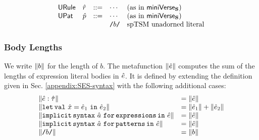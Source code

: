 \[\begin{array}{lllllll}
\mathsf{URule} & \hat{r} & ::= 
& \cdots & \text{(as in $\mathsf{miniVerse}_\textbf{S}$)}\\
\mathsf{UPat} & \hat{p} & ::= 
& \cdots & \text{(as in $\mathsf{miniVerse}_\textbf{S}$)}\\
&&& {\texttt{/}b\texttt{/}} & \text{spTSM unadorned literal}
\end{array}\]
\subsubsection{Body Lengths}
We write $\Vert b \Vert$ for the length of $b$. The metafunction $\Vert {\hat e} \Vert$ computes the sum of the lengths of expression literal bodies in ${\hat e}$. It is defined by extending the definition given in Sec. \ref{appendix:SES-syntax} with the following additional cases:
\[
\begin{array}{ll}
\Vert {\hat e} : {\hat\tau} \Vert & = \Vert {\hat e} \Vert\\
\Vert \texttt{let\,val}~{\hat x}={\hat e}_1~\texttt{in}~{\hat e}_2 \Vert & = \Vert {\hat e}_1 \Vert + \Vert {\hat e}_2 \Vert\\
\Vert \texttt{implicit\,syntax}~\hat{a}~\texttt{for\,expressions\,in}~{\hat e} \Vert & = \Vert {\hat e} \Vert\\
\Vert \texttt{implicit\,syntax}~\hat{a}~\texttt{for\,patterns\,in}~{\hat e} \Vert & = \Vert {\hat e} \Vert\\
\Vert {\texttt{/}b\texttt{/}} \Vert & = \Vert b \Vert
\end{array}
\]

